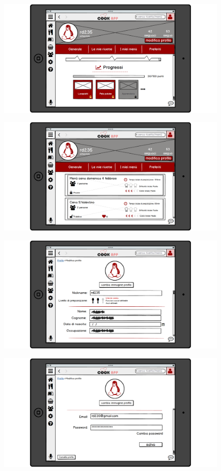 \begin{figure}[H]
	\centering
	\includegraphics[width=0.95\linewidth]{img/mockup/Profilo-generale2.png}
\end{figure}
\begin{figure}[H]
	\centering
	\includegraphics[width=0.95\linewidth]{img/mockup/Profilo-menu.png}
\end{figure}
\begin{figure}[H]
	\centering
	\includegraphics[width=0.95\linewidth]{img/mockup/Profilo-modifica.png}
\end{figure}
\begin{figure}[H]
	\centering
	\includegraphics[width=0.95\linewidth]{img/mockup/Profilo-modifica2.png}
\end{figure}
